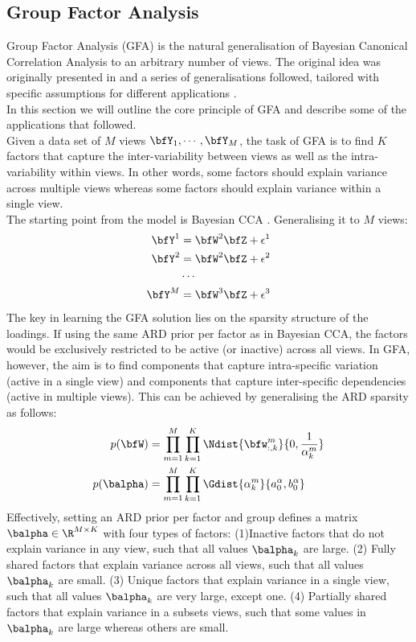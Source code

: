 \subsection{Group Factor Analysis}

Group Factor Analysis (GFA) is the natural generalisation of Bayesian Canonical Correlation Analysis to an arbitrary number of views.
The original idea was originally presented in \cite{Virtanen2012} and a series of generalisations followed, tailored with specific assumptions for different applications \cite{XX}.\\
In this section we will outline the core principle of GFA and describe some of the applications that followed.\\

Given a data set of $M$ views $\bfY_1, \cdots, \bfY_M$, the task of GFA is to find $K$ factors that capture the inter-variability between views as well as the intra-variability within views. In other words, some factors should explain variance across multiple views whereas some factors should explain variance within a single view.\\

The starting point from the model is Bayesian CCA . Generalising it to $M$ views:
\begin{align*}
	\bfY^{1} &= \bfW^{2} \bfZ + \epsilon^{1} \\
	\bfY^{2} &= \bfW^{2} \bfZ + \epsilon^{2} \\
	& \cdots \\
	\bfY^{M} &= \bfW^{3} \bfZ + \epsilon^{3}
\end{align*}
The key in learning the GFA solution lies on the sparsity structure of the loadings. If using the same ARD prior per factor as in Bayesian CCA, the factors would be exclusively restricted to be active (or inactive) across all views. In GFA, however, the aim is to find components that capture intra-specific variation (active in a single view) and components that capture inter-specific dependencies (active in multiple views). This can be achieved by generalising the ARD sparsity as follows:
\begin{align}
	p(\bfW) &= \prod_{m=1}^{M} \prod_{k=1}^{K} \Ndist{\bfw_{:,k}^m}{0,\frac{1}{\alpha_k^m}} \\
	p(\balpha) &= \prod_{m=1}^{M} \prod_{k=1}^{K} \Gdist{\alpha_k^m}{a_0^\alpha, b_0^\alpha}
\end{align}
Effectively, setting an ARD prior per factor and group defines a matrix $\balpha \in \R^{M \times K}$ with four types of factors: (1)Inactive factors that do not explain variance in any view, such that all values $\balpha_k$ are large. (2) Fully shared factors that explain variance across all views, such that all values $\balpha_k$ are small. (3) Unique factors that explain variance in a single view, such that all values $\balpha_k$ are very large, except one. (4) Partially shared factors that explain variance in a subsets views, such that some values in $\balpha_k$ are large whereas others are small.\\

